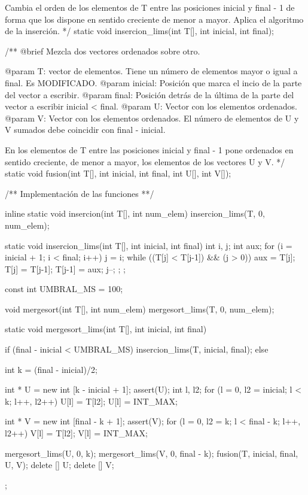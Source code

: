 \documentclass[12pt,spanish]{article}
\begin{document}
\begin{multicols}{2}
\begin{tcblisting}
   Cambia el orden de los elementos de T entre las posiciones
   inicial y final - 1 de forma que los dispone en sentido creciente
   de menor a mayor.
   Aplica el algoritmo de la inserción.
*/
static void insercion_lims(int T[], int inicial, int final);

/**
   @brief Mezcla dos vectores ordenados sobre otro.

   @param T: vector de elementos. Tiene un número de elementos 
                   mayor o igual a final. Es MODIFICADO.
   @param inicial: Posición que marca el incio de la parte del
                   vector a escribir.
   @param final: Posición detrás de la última de la parte del
                   vector a escribir
		   inicial < final.
   @param U: Vector con los elementos ordenados.
   @param V: Vector con los elementos ordenados.
             El número de elementos de U y V sumados debe coincidir
             con final - inicial.

   En los elementos de T entre las posiciones inicial y final - 1
   pone ordenados en sentido creciente, de menor a mayor, los
   elementos de los vectores U y V.
*/
static void fusion(int T[], int inicial, int final, int U[], int V[]);

/**
   Implementación de las funciones
**/

inline static void insercion(int T[], int num_elem)
{
  insercion_lims(T, 0, num_elem);
}

static void insercion_lims(int T[], int inicial, int final)
{
  int i, j;
  int aux;
  for (i = inicial + 1; i < final; i++) {
    j = i;
    while ((T[j] < T[j-1]) && (j > 0)) {
      aux = T[j];
      T[j] = T[j-1];
      T[j-1] = aux;
      j--;
    };
  };
}

const int UMBRAL_MS = 100;

void mergesort(int T[], int num_elem)
{
  mergesort_lims(T, 0, num_elem);
}

static void mergesort_lims(int T[], int inicial, int final)
{
  if (final - inicial < UMBRAL_MS)
    {
      insercion_lims(T, inicial, final);
    } else {
      int k = (final - inicial)/2;

      int * U = new int [k - inicial + 1];
      assert(U);
      int l, l2;
      for (l = 0, l2 = inicial; l < k; l++, l2++)
	U[l] = T[l2];
      U[l] = INT_MAX;

      int * V = new int [final - k + 1];
      assert(V);
      for (l = 0, l2 = k; l < final - k; l++, l2++)
	V[l] = T[l2];
      V[l] = INT_MAX;

      mergesort_lims(U, 0, k);
      mergesort_lims(V, 0, final - k);
      fusion(T, inicial, final, U, V);
      delete [] U;
      delete [] V;
    };
}
  

\end{tcblisting}
\end{multicols}
\end{document}
